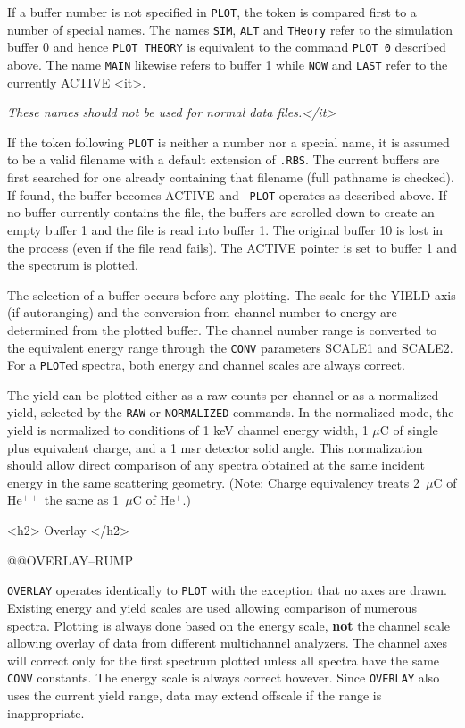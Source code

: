 If a buffer number is not specified in {\tt PLOT}, the token is compared first
to a number of special names.  The names {\tt SIM}, {\tt ALT} and {\tt THeory}
refer to the simulation buffer 0 and hence {\tt PLOT THEORY} is equivalent to
the command {\tt PLOT 0} described above.  The name {\tt MAIN} likewise refers
to buffer 1 while {\tt NOW} and {\tt LAST} refer to the currently ACTIVE
<it>.  {\it These names should not be used for normal data files.</it>

If the token following {\tt PLOT} is neither a number nor a special name, it
is assumed to be a valid filename with a default extension of {\tt .RBS}.  The
current buffers are first searched for one already containing that filename
(full pathname is checked).  If found, the buffer becomes ACTIVE and {\tt
PLOT} operates as described above.  If no buffer currently contains the file,
the buffers are scrolled down to create an empty buffer 1 and the file is read
into buffer 1.  The original buffer 10 is lost in the process (even if the
file read fails).  The ACTIVE pointer is set to buffer 1 and the spectrum is
plotted.

The selection of a buffer occurs before any plotting.  The scale for the YIELD
axis (if autoranging) and the conversion from channel number to energy are
determined from the plotted buffer.  The channel number range is converted to
the equivalent energy range through the {\tt CONV} parameters {\tts SCALE1} and
{\tts SCALE2}.  For a {\tt PLOT}ed spectra, both energy and channel scales are always
correct.  

The yield can be plotted either as a raw counts per channel or as a normalized
yield, selected by the {\tt RAW} or {\tt NORMALIZED} commands.  In the
normalized mode, the yield is normalized to conditions of 1 keV channel energy
width, 1 $\mu$C of single plus equivalent charge, and a 1 msr detector solid
angle.  This normalization should allow direct comparison of any spectra
obtained at the same incident energy in the same scattering geometry.  (Note:
Charge equivalency treats 2~$\mu$C of He$^{++}$ the same as 1~$\mu$C of
He$^+$.)

\newpage
<h2> Overlay </h2>


@@{OVERLAY--RUMP} 

{\tt OVERLAY} operates identically to {\tt PLOT} with the exception that no
axes are drawn.  Existing energy and yield scales are used allowing
comparison of numerous spectra.  Plotting is always done based on the energy 
scale, {\bf not} the channel scale allowing overlay of data from different
multichannel analyzers.  The channel axes will correct only for the first
spectrum plotted unless all spectra have the same {\tt CONV} constants.  
The energy scale is always correct however.  Since {\tt OVERLAY} also uses the
current yield range, data may extend offscale if the range is inappropriate.

}
